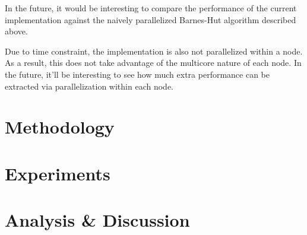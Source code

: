 \documentclass{article}
\begin{document}
In the future, it would be interesting to compare the performance of the current implementation
against the naively parallelized Barnes-Hut algorithm described above.

Due to time constraint, the implementation is also not parallelized within a node. As a result, this
does not take advantage of the multicore nature of each node. In the future, it'll be interesting to
see how much extra performance can be extracted via parallelization within each node.

\section*{Methodology}


\section*{Experiments}

\section*{Analysis \& Discussion}
\end{document}
